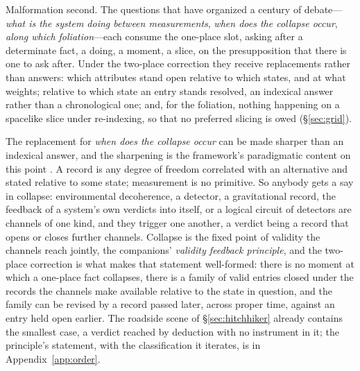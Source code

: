 Malformation second. The questions that have organized a century of debate---\emph{what is the system doing between measurements}, \emph{when does the collapse occur}, \emph{along which foliation}---each consume the one-place slot, asking after a determinate fact, a doing, a moment, a slice, on the presupposition that there is one to ask after. Under the two-place correction they receive replacements rather than answers: which attributes stand open relative to which states, and at what weights; relative to which state an entry stands resolved, an indexical answer rather than a chronological one; and, for the foliation, nothing happening on a spacelike slice under re-indexing, so that no preferred slicing is owed (\S\ref{sec:grid}).

The replacement for \emph{when does the collapse occur} can be made sharper than an indexical answer, and the sharpening is the framework's paradigmatic content on this point \cite{Aethus, AethusQuant}. A record is any degree of freedom correlated with an alternative and stated relative to some state; measurement is no primitive. So anybody gets a say in collapse: environmental decoherence, a detector, a gravitational record, the feedback of a system's own verdicts into itself, or a logical circuit of detectors are channels of one kind, and they trigger one another, a verdict being a record that opens or closes further channels. Collapse is the fixed point of validity the channels reach jointly, the companions' \emph{validity feedback principle}, and the two-place correction is what makes that statement well-formed: there is no moment at which a one-place fact collapses, there is a family of valid entries closed under the records the channels make available relative to the state in question, and the family can be revised by a record passed later, across proper time, against an entry held open earlier. The roadside scene of \S\ref{sec:hitchhiker} already contains the smallest case, a verdict reached by deduction with no instrument in it; the principle's statement, with the classification it iterates, is in Appendix~\ref{app:order}.

